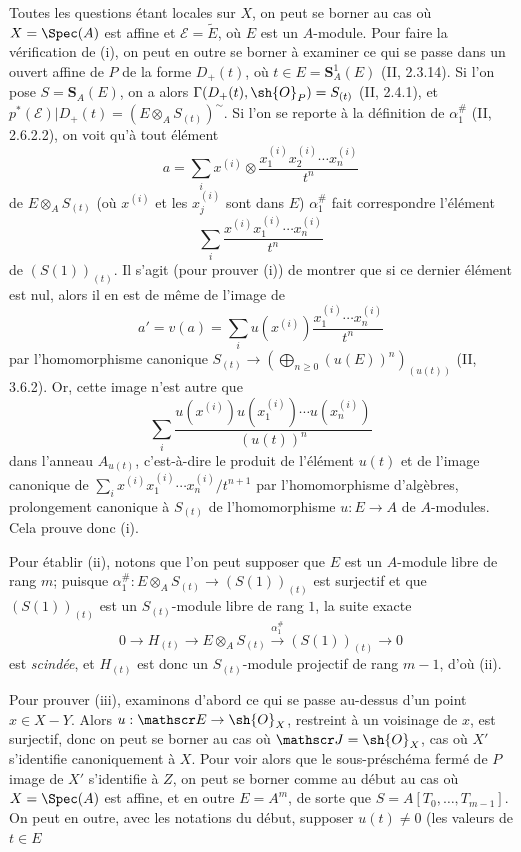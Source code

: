 Toutes les questions étant locales sur $X$, on peut se borner au cas où $X=\Spec(A)$ est affine et $\mathscr E=\widetilde E$, où $E$ est un $A$-module. Pour faire la vérification de (i), on peut en outre se borner à examiner ce qui se passe dans un ouvert affine de $P$ de la forme $D_+(t)$, où $t\in E=\mathbf S_A^1(E)$ (II, 2.3.14). Si l'on pose $S=\mathbf S_A(E)$, on a alors $\Gamma(D_+(t),\sh{O}_P)=S_{(t)}$ (II, 2.4.1), et $p^*(\mathscr E)|D_+(t)=(E\otimes_A S_{(t)})^\sim$. Si l'on se reporte à la définition de $\alpha_1^{\#}$ (II, 2.6.2.2), on voit qu'à tout élément
\[
  a=\sum_i x^{(i)}\otimes\frac{x_1^{(i)}x_2^{(i)}\cdots x_n^{(i)}}{t^n}
\]
de $E\otimes_A S_{(t)}$ (où $x^{(i)}$ et les $x_j^{(i)}$ sont dans $E$) $\alpha_1^{\#}$ fait correspondre l'élément
\[
  \sum_i\frac{x^{(i)}x_1^{(i)}\cdots x_n^{(i)}}{t^n}
\]
de $(S(1))_{(t)}$. Il s'agit (pour prouver (i)) de montrer que si ce dernier élément est nul, alors il en est de même de l'image de
\[
  a'=v(a)=\sum_i u(x^{(i)})\frac{x_1^{(i)}\cdots x_n^{(i)}}{t^n}
\]
par l'homomorphisme canonique $S_{(t)}\to(\bigoplus_{n\geq0}(u(E))^n)_{(u(t))}$ (II, 3.6.2). Or, cette image n'est autre que
\[
  \sum_i\frac{u(x^{(i)})u(x_1^{(i)})\cdots u(x_n^{(i)})}{(u(t))^n}
\]
dans l'anneau $A_{u(t)}$, c'est-à-dire le produit de l'élément $u(t)$ et de l'image canonique de $\sum_i x^{(i)}x_1^{(i)}\cdots x_n^{(i)}/t^{n+1}$ par l'homomorphisme d'algèbres, prolongement canonique à $S_{(t)}$ de l'homomorphisme $u:E\to A$ de $A$-modules. Cela prouve donc (i).

Pour établir (ii), notons que l'on peut supposer que $E$ est un $A$-module libre de rang $m$; puisque $\alpha_1^{\#}:E\otimes_A S_{(t)}\to(S(1))_{(t)}$ est surjectif et que $(S(1))_{(t)}$ est un $S_{(t)}$-module libre de rang $1$, la suite exacte
\[
  0\longrightarrow H_{(t)}\longrightarrow E\otimes_A S_{(t)}\xrightarrow{\alpha_1^{\#}}(S(1))_{(t)}\longrightarrow0
\]
est \emph{scindée}, et $H_{(t)}$ est donc un $S_{(t)}$-module projectif de rang $m-1$, d'où (ii).

Pour prouver (iii), examinons d'abord ce qui se passe au-dessus d'un point $x\in X-Y$. Alors $u:\mathscr E\to\sh{O}_X$, restreint à un voisinage de $x$, est surjectif, donc on peut se borner au cas où $\mathscr J=\sh{O}_X$, cas où $X'$ s'identifie canoniquement à $X$. Pour voir alors que le sous-préschéma fermé de $P$ image de $X'$ s'identifie à $Z$, on peut se borner comme au début au cas où $X=\Spec(A)$ est affine, et en outre $E=A^m$, de sorte que $S=A[T_0,\ldots,T_{m-1}]$. On peut en outre, avec les notations du début, supposer $u(t)\ne0$ (les valeurs de $t\in E$

